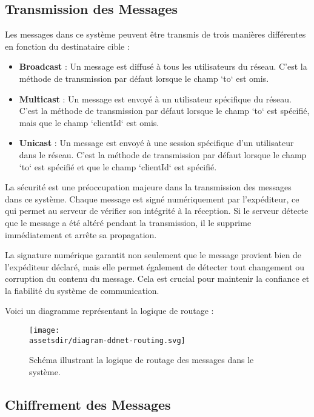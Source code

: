 \subsection{Transmission des Messages}

Les messages dans ce système peuvent être transmis de trois manières différentes en fonction du destinataire cible :

\begin{itemize}
  \item \textbf{Broadcast} : Un message est diffusé à tous les utilisateurs du réseau. C'est la méthode de transmission par défaut lorsque le champ `to` est omis.
  \item \textbf{Multicast} : Un message est envoyé à un utilisateur spécifique du réseau. C'est la méthode de transmission par défaut lorsque le champ `to` est spécifié, mais que le champ `clientId` est omis.
  \item \textbf{Unicast} : Un message est envoyé à une session spécifique d'un utilisateur dans le réseau. C'est la méthode de transmission par défaut lorsque le champ `to` est spécifié et que le champ `clientId` est spécifié.
\end{itemize}

La sécurité est une préoccupation majeure dans la transmission des messages dans ce système. Chaque message est signé numériquement par l'expéditeur, ce qui permet au serveur de vérifier son intégrité à la réception. Si le serveur détecte que le message a été altéré pendant la transmission, il le supprime immédiatement et arrête sa propagation.

La signature numérique garantit non seulement que le message provient bien de l'expéditeur déclaré, mais elle permet également de détecter tout changement ou corruption du contenu du message. Cela est crucial pour maintenir la confiance et la fiabilité du système de communication.

Voici un diagramme représentant la logique de routage :

\begin{figure}[H]
  \begin{center}
    \texttt{[image: \\assetsdir/diagram-ddnet-routing.svg]}
  \end{center}
  \caption[Logique de Routage des Messages]{Schéma illustrant la logique de routage des messages dans le système.}
\end{figure}


\subsection{Chiffrement des Messages}

